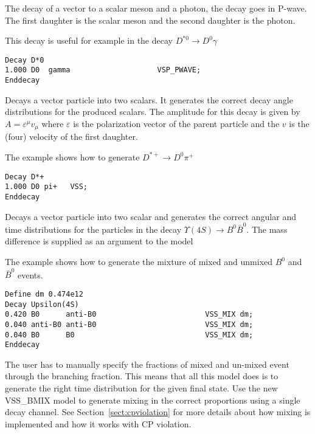 
\Expl
The decay of a vector to a scalar meson and a photon, the decay 
goes in P-wave. The first daughter is the scalar meson and the second
daughter is the photon. 

\Example
This decay is useful for example in the decay $D^{*0}\rightarrow D^0\gamma$
\begin{verbatim}
Decay D*0
1.000 D0  gamma                    VSP_PWAVE;
Enddecay
\end{verbatim}




\label{vss}



\Expl
Decays a vector particle into two scalars. It generates the 
correct decay angle distributions for the produced scalars.
The amplitude for this decay is given by 
$A=\varepsilon^{\mu}v_{\mu}$ where $\varepsilon$ is the 
polarization vector of the parent particle and the $v$ is the
(four) velocity of the first daughter.

\Example
The example shows how to generate $D^{*+} \rightarrow D^{0}\pi^+$
\begin{verbatim}
Decay D*+
1.000 D0 pi+   VSS;
Enddecay
\end{verbatim}




\label{vssmix}



\Expl
Decays a vector particle into two scalar and generates the
correct angular and time distributions for the particles  in the
decay $\Upsilon(4S) \rightarrow B^0\bar B^0$. The mass
difference is supplied as an argument to the model

\Example
The example shows how to generate the mixture of mixed and
unmixed $B^0$ and $\bar B^0$ events.
\begin{verbatim}
Define dm 0.474e12
Decay Upsilon(4S)
0.420 B0      anti-B0                         VSS_MIX dm;
0.040 anti-B0 anti-B0                         VSS_MIX dm;
0.040 B0      B0                              VSS_MIX dm;
Enddecay
\end{verbatim}

\Notes
The user has to manually specify the fractions of mixed and un-mixed event
through the branching fraction. This means that all this model does is to
generate the right time distribution for the given final state.  Use the
new VSS\_BMIX model to generate mixing in the correct proportions using a
single decay channel.  See Section~\ref{sect:cpviolation} for more details
about how mixing is implemented and how it works with CP violation.



